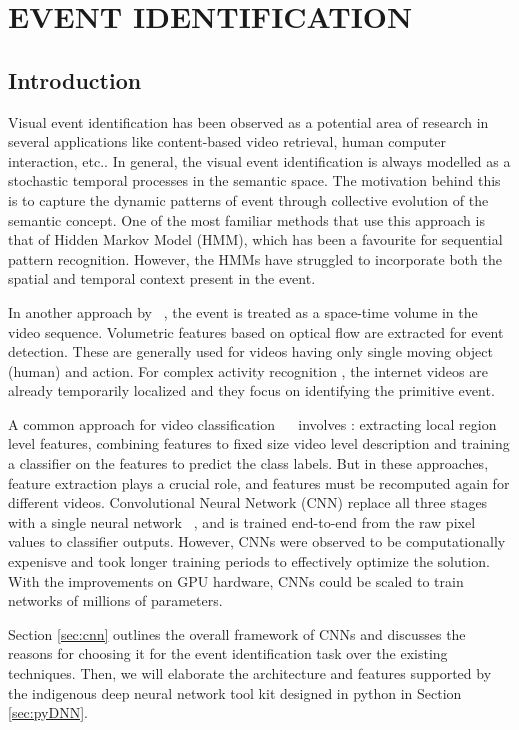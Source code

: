 \chapter{EVENT IDENTIFICATION}
 \label{chap:eventrec}
 \section{Introduction}
Visual event identification has been observed as a potential area of research in several applications like  content-based video retrieval, human computer interaction, etc..  In general, the visual event identification is always modelled as a stochastic temporal processes in the semantic space.  The motivation behind this is to capture the dynamic patterns of event through collective evolution of the semantic concept.  One of the most familiar methods that use this approach is that of Hidden Markov Model (HMM), which has been a favourite for sequential pattern recognition.  However, the HMMs have struggled to incorporate both the spatial and temporal context present in the event.  
\par In another approach by ~\cite{YanKe05}, the event is treated as a space-time volume in the video sequence.  Volumetric features based on optical flow are extracted for event detection.  These are generally used for videos having only single moving object (human) and action.  For complex activity recognition \citep{YanKe07}, the internet videos are already temporarily localized and they focus on identifying the primitive event.
\par A common approach for video classification ~\citep{Liu09}~\citep{Niebles10} involves : extracting local region level features, combining features to fixed size video level description and training a classifier on the features to predict the class labels.  But in these approaches, feature extraction plays a crucial role, and features must be recomputed again for different videos.  Convolutional Neural Network (CNN) replace all three stages with a single neural network ~\cite{Ji13},  and is trained end-to-end from the raw pixel values to classifier outputs. However, CNNs were observed to be computationally expenisve and took longer training periods to effectively optimize the solution.  With the improvements on GPU hardware, CNNs could be scaled to train networks of millions of parameters.

\par Section \ref{sec:cnn} outlines the overall framework of CNNs and discusses the reasons for choosing it for the event identification task over the existing techniques.  Then, we will elaborate the architecture and features supported by the indigenous deep neural network tool kit designed in python in Section \ref{sec:pyDNN}. 

